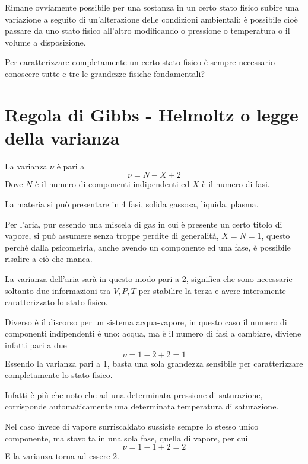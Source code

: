 \begin{adjustwidth}{2in}{}
	Rimane ovviamente possibile per una sostanza in un certo stato fisico subire una variazione a seguito di un'alterazione delle condizioni ambientali: è possibile cioè passare da uno stato fisico all'altro modificando o pressione o temperatura o il volume a disposizione. \newline
	
	
	Per caratterizzare completamente un certo stato fisico è sempre necessario conoscere tutte e tre le grandezze fisiche fondamentali? \newline
	
	\section{Regola di Gibbs - Helmoltz o legge della varianza}
	La varianza $\nu$ è pari a 
	\begin{equation}\label{eq:1.0}
		\boxed{\nu = N-X+2}
	\end{equation}
	Dove $N$ è il numero di componenti indipendenti ed $X$ è il numero di fasi. \newline
	
	La materia si può presentare in 4 fasi, solida gassosa, liquida, plasma. 
	
	Per l'aria, pur essendo una miscela di gas in cui è presente un certo titolo di vapore, si può assumere senza troppe perdite di generalità, $X=N=1$, questo perché dalla psicometria, anche avendo un componente ed una fase, è possibile risalire a ciò che manca. 
	
	La varianza dell'aria sarà in questo modo pari a 2, significa che sono necessarie soltanto due informazioni tra $V,P,T$ per stabilire  la terza e avere interamente caratterizzato lo stato fisico. \newline
	
	Diverso è il discorso per un sistema acqua-vapore, in questo caso il numero di componenti indipendenti è uno: acqua, ma è il numero di fasi a cambiare, diviene infatti pari a due
	\[\nu = 1-2+2 = 1\] 
	Essendo la varianza pari a 1, basta una sola grandezza sensibile per caratterizzare completamente lo stato  fisico. 
	
	Infatti è più che noto che ad una determinata pressione di saturazione, corrisponde automaticamente una determinata temperatura di saturazione. \newline
	
	Nel caso invece di vapore surriscaldato sussiste sempre lo stesso unico componente, ma stavolta in una sola fase, quella di vapore, per cui
	\[\nu = 1-1+2 = 2\] 
	E la varianza torna ad essere 2. \newline
	

\end{adjustwidth}
